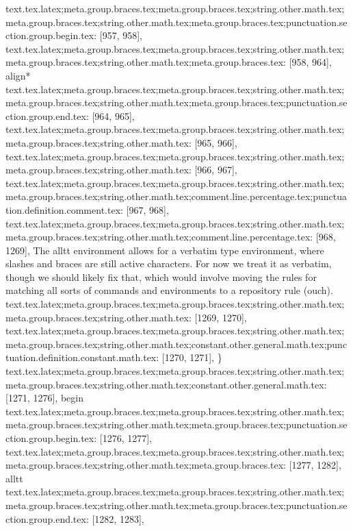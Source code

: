 {{{{{{{{{{{{{{{{{{{{{{{{{{{{{{{{text.tex.latex;meta.group.braces.tex;meta.group.braces.tex;string.other.math.tex;meta.group.braces.tex;string.other.math.tex;meta.group.braces.tex;punctuation.section.group.begin.tex: [957, 958], {{}
text.tex.latex;meta.group.braces.tex;meta.group.braces.tex;string.other.math.tex;meta.group.braces.tex;string.other.math.tex;meta.group.braces.tex: [958, 964], {align*}
text.tex.latex;meta.group.braces.tex;meta.group.braces.tex;string.other.math.tex;meta.group.braces.tex;string.other.math.tex;meta.group.braces.tex;punctuation.section.group.end.tex: [964, 965], {}}
text.tex.latex;meta.group.braces.tex;meta.group.braces.tex;string.other.math.tex;meta.group.braces.tex;string.other.math.tex: [965, 966], {
}
text.tex.latex;meta.group.braces.tex;meta.group.braces.tex;string.other.math.tex;meta.group.braces.tex;string.other.math.tex: [966, 967], {
}
text.tex.latex;meta.group.braces.tex;meta.group.braces.tex;string.other.math.tex;meta.group.braces.tex;string.other.math.tex;comment.line.percentage.tex;punctuation.definition.comment.tex: [967, 968], {%
text.tex.latex;meta.group.braces.tex;meta.group.braces.tex;string.other.math.tex;meta.group.braces.tex;string.other.math.tex;comment.line.percentage.tex: [968, 1269], { The alltt environment allows for a verbatim type environment, where slashes and braces are still active characters. For now we treat it as verbatim, though we should likely fix that, which would involve moving the rules for matching all sorts of commands and environments to a repository rule (ouch).}
text.tex.latex;meta.group.braces.tex;meta.group.braces.tex;string.other.math.tex;meta.group.braces.tex;string.other.math.tex: [1269, 1270], {
}
text.tex.latex;meta.group.braces.tex;meta.group.braces.tex;string.other.math.tex;meta.group.braces.tex;string.other.math.tex;constant.other.general.math.tex;punctuation.definition.constant.math.tex: [1270, 1271], {\}
text.tex.latex;meta.group.braces.tex;meta.group.braces.tex;string.other.math.tex;meta.group.braces.tex;string.other.math.tex;constant.other.general.math.tex: [1271, 1276], {begin}
text.tex.latex;meta.group.braces.tex;meta.group.braces.tex;string.other.math.tex;meta.group.braces.tex;string.other.math.tex;meta.group.braces.tex;punctuation.section.group.begin.tex: [1276, 1277], {{}
text.tex.latex;meta.group.braces.tex;meta.group.braces.tex;string.other.math.tex;meta.group.braces.tex;string.other.math.tex;meta.group.braces.tex: [1277, 1282], {alltt}
text.tex.latex;meta.group.braces.tex;meta.group.braces.tex;string.other.math.tex;meta.group.braces.tex;string.other.math.tex;meta.group.braces.tex;punctuation.section.group.end.tex: [1282, 1283], {}}
}}}}}}}}}}}}}}}}}}}}}}}}}}}}}}}}}}
